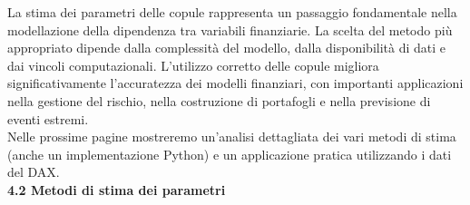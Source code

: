 \documentclass[a4paper,12pt]{article}
\begin{document}
La stima dei parametri delle copule rappresenta un passaggio fondamentale nella modellazione della dipendenza tra variabili finanziarie. La scelta del metodo più appropriato dipende dalla complessità del modello, dalla disponibilità di dati e dai vincoli computazionali. L'utilizzo corretto delle copule migliora significativamente l'accuratezza dei modelli finanziari, con importanti applicazioni nella gestione del rischio, nella costruzione di portafogli e nella previsione di eventi estremi.\\
\newline
Nelle prossime pagine mostreremo un'analisi dettagliata dei vari metodi di stima (anche un implementazione Python) e un applicazione pratica utilizzando i dati del DAX.\\
\newline
\noindent\textbf{4.2 Metodi di stima dei parametri} \\
\end{document}

